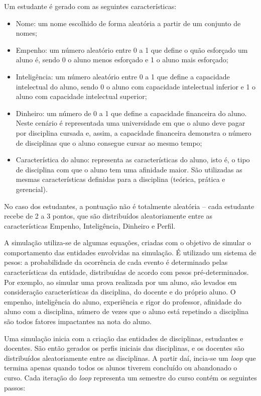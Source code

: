Um estudante é gerado com as seguintes características:

\begin{itemize}
  \item Nome: um nome escolhido de forma aleatória a partir de um conjunto de nomes;
  \item Empenho: um número aleatório entre 0 a 1 que define o quão esforçado um aluno é, sendo 0 o aluno menos esforçado e 1 o aluno mais esforçado;
  \item Inteligência: um número aleatório entre 0 a 1 que define a capacidade intelectual do aluno, sendo 0 o aluno com capacidade intelectual inferior e 1 o aluno com capacidade intelectual superior;
  \item Dinheiro: um número de 0 a 1 que define a capacidade financeira do aluno. Neste cenário é representada uma universidade em que o aluno deve pagar por disciplina cursada e, assim, a capacidade financeira demonstra o número de disciplinas que o aluno consegue cursar ao mesmo tempo;
  \item Característica do aluno: representa as características do aluno, isto é, o tipo de disciplina com que o aluno tem uma afinidade maior. São utilizadas as mesmas características definidas para a disciplina (teórica, prática e gerencial).
\end{itemize}

No caso dos estudantes, a pontuação não é totalmente aleatória -- cada estudante recebe de 2 a 3 pontos, que são distribuídos aleatoriamente entre as características Empenho, Inteligência, Dinheiro e Perfil.

A simulação utiliza-se de algumas equações, criadas com o objetivo de simular o comportamento das entidades envolvidas na simulação. É utilizado um sistema de pesos: a probabilidade da ocorrência de cada evento é determinado pelas características da entidade, distribuídas de acordo com pesos pré-determinados. Por exemplo, ao simular uma prova realizada por um aluno, são levados em consideração características da disciplina, do docente e do próprio aluno. O empenho, inteligência do aluno, experiência e rigor do professor, afinidade do aluno com a disciplina, número de vezes que o aluno está repetindo a disciplina são todos fatores impactantes na nota do aluno.

Uma simulação inicia com a criação das entidades de disciplinas, estudantes e docentes. São então gerados os perfis iniciais das disciplinas, e os docentes são distribuídos aleatoriamente entre as disciplinas. A partir daí, incia-se um {\em loop} que termina apenas quando todos os alunos tiverem concluído ou abandonado o curso. Cada iteração do {\em loop} representa um semestre do curso contém os seguintes passos:


